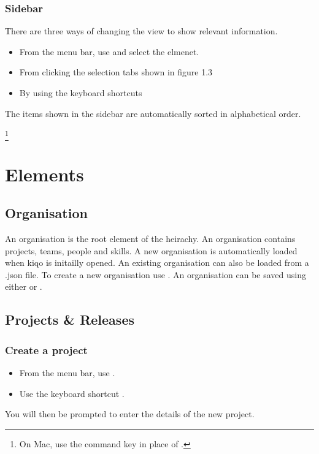 \documentclass[11pt,fleqn]{book} %
\begin{document}
\subsection{Sidebar}
There are three ways of changing the view to show relevant information.
\begin{itemize}
  \item From the menu bar, use  and select the elmenet.
  \item From clicking the selection tabs shown in figure 1.3
  \item By using the keyboard shortcuts 
\end{itemize}
The items shown in the sidebar are automatically sorted in alphabetical order.

\footnote{On Mac, use the command key \keys{\cmd} in place of \keys{\ctrl}.}


\chapter{Elements}
\section{Organisation}
An organisation is the root element of the heirachy. An organisation contains projects, teams, people and skills.
A new organisation is automatically loaded when kiqo is initailly opened. An existing organisation can also be loaded
from a .json file. To create a new organisation use . An organisation can be saved using
either  or .

\section{Projects \& Releases}
\subsection{Create a project}
    \begin{itemize}
        \item From the menu bar, use .
        \item Use the keyboard shortcut .
    \end{itemize}
    You will then be prompted to enter the details of the new project.
\end{document}
